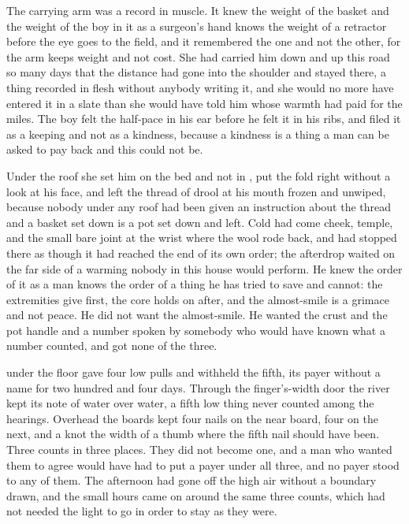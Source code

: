 The carrying arm was a record in muscle. It knew the weight of the basket and the weight of the boy in it as a surgeon's hand knows the weight of a retractor before the eye goes to the field, and it remembered the one and not the other, for the arm keeps weight and not cost. She had carried him down and up this road so many days that the distance had gone into the shoulder and stayed there, a thing recorded in flesh without anybody writing it, and she would no more have entered it in a slate than she would have told him whose warmth had paid for the miles. The boy felt the half-pace in his ear before he felt it in his ribs, and filed it as a keeping and not as a kindness, because a kindness is a thing a man can be asked to pay back and this could not be.

\scenebreak

Under the roof she set him on the bed and not in , put the fold right without a look at his face, and left the thread of drool at his mouth frozen and unwiped, because nobody under any roof had been given an instruction about the thread and a basket set down is a pot set down and left. Cold had come cheek, temple, and the small bare joint at the wrist where the wool rode back, and had stopped there as though it had reached the end of its own order; the afterdrop waited on the far side of a warming nobody in this house would perform. He knew the order of it as a man knows the order of a thing he has tried to save and cannot: the extremities give first, the core holds on after, and the almost-smile is a grimace and not peace. He did not want the almost-smile. He wanted the crust and the pot handle and a number spoken by somebody who would have known what a number counted, and got none of the three.

 under the floor gave four low pulls and withheld the fifth, its payer without a name for two hundred and four days. Through the finger's-width door the river kept its note of water over water, a fifth low thing never counted among the hearings. Overhead the boards kept four nails on the near board, four on the next, and a knot the width of a thumb where the fifth nail should have been. Three counts in three places. They did not become one, and a man who wanted them to agree would have had to put a payer under all three, and no payer stood to any of them. The afternoon had gone off the high air without a boundary drawn, and the small hours came on around the same three counts, which had not needed the light to go in order to stay as they were.

